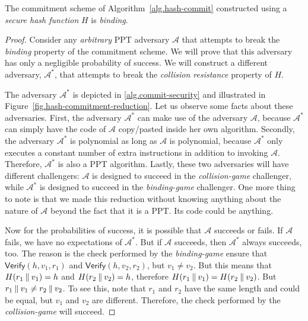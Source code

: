 \begin{theorem}
  The commitment scheme of Algorithm~\ref{alg.hash-commit} constructed using a \emph{secure
  hash function} $H$ is \emph{binding}.
\end{theorem}
\begin{proof}
  Consider any \emph{arbitrary}
  PPT adversary $\mathcal{A}$ that attempts to break the \emph{binding} property of the commitment scheme.
  We will prove that this adversary has only a negligible probability of success.
  We will construct a different adversary, $\mathcal{A}^*$, that attempts to break the \emph{collision resistance}
  property of $H$.

  The adversary $\mathcal{A}^*$ is depicted in \ref{alg.commit-security} and illustrated in
  Figure~\ref{fig.hash-commitment-reduction}. Let us observe some facts about these adversaries. First,
  the adversary $\mathcal{A}^*$ can make use of the adversary $\mathcal{A}$, because $\mathcal{A}^*$
  can simply have the code of $\mathcal{A}$ copy/pasted inside her own algorithm. Secondly,
  the adversary $\mathcal{A}^*$ is polynomial as long as $\mathcal{A}$ is polynomial, because
  $\mathcal{A}^*$ only executes a constant number of extra instructions in addition to invoking
  $\mathcal{A}$. Therefore, $\mathcal{A}^*$ is also a PPT algorithm. Lastly, these two adversaries
  will have different challengers: $\mathcal{A}$ is designed to succeed in the \emph{collision-game}
  challenger, while $\mathcal{A}^*$ is designed to succeed in the \emph{binding-game} challenger.
  One more thing to note is that we made this reduction without knowing anything about the
  nature of $\mathcal{A}$ beyond the fact that it is a PPT. Its code could be anything.

  Now for the probabilities of success, it is possible that $\mathcal{A}$ succeeds or fails.
  If $\mathcal{A}$ fails, we have no expectations of $\mathcal{A}^*$. But if $\mathcal{A}$ succeeds,
  then $\mathcal{A}^*$ always succeeds, too. The reason is the check performed by the \emph{binding-game}
  ensure that $\textsf{Verify}(h, v_1, r_1)$ and $\textsf{Verify}(h, v_2, r_2)$, but $v_1 \neq v_2$.
  But this means that $H(r_1 \mathbin{\|} v_1) = h$ and $H(r_2 \mathbin{\|} v_2) = h$, therefore
  $H(r_1 \mathbin{\|} v_1) = H(r_2 \mathbin{\|} v_2)$. But $r_1 \mathbin{\|} v_1 \neq r_2 \mathbin{\|} v_2$. To see this,
  note that $r_1$ and $r_2$ have the same length and could be equal, but $v_1$ and $v_2$ are different.
  Therefore, the check performed by the \emph{collision-game} will succeed.


\end{proof}
